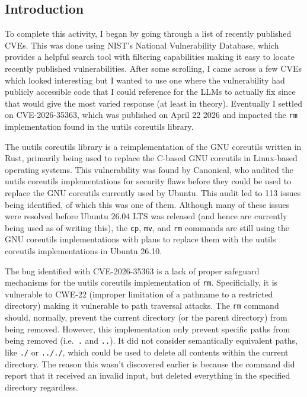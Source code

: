 \hypertarget{introduction}{%
\subsection{Introduction}\label{introduction}}

To complete this activity, I began by going through a list of recently
published CVEs. This was done using NIST's National Vulnerability
Database, which provides a helpful search tool with filtering
capabilities making it easy to locate recently published
vulnerabilities. After some scrolling, I came across a few CVEs which
looked interesting but I wanted to use one where the vulnerability had
publicly accessible code that I could reference for the LLMs to actually
fix since that would give the most varied response (at least in theory).
Eventually I settled on CVE-2026-35363, which was published on April 22
2026 and impacted the \texttt{rm} implementation found in the uutils
coreutils library.

The uutils coreutils library is a reimplementation of the GNU coreutils
written in Rust, primarily being used to replace the C-based GNU
coreutils in Linux-based operating systems. This vulnerability was found
by Canonical, who audited the uutils coreutils implementations for
security flaws before they could be used to replace the GNU coreutils
currently used by Ubuntu. This audit led to 113 issues being identified,
of which this was one of them. Although many of these issues were
resolved before Ubuntu 26.04 LTS was released (and hence are currently
being used as of writing this), the \texttt{cp}, \texttt{mv}, and
\texttt{rm} commands are still using the GNU coreutils implementations
with plans to replace them with the uutils coreutils implementations in
Ubuntu 26.10.

The bug identified with CVE-2026-35363 is a lack of proper safeguard
mechanisms for the uutils coreutils implementation of \texttt{rm}.
Specificially, it is vulnerable to CWE-22 (improper limitation of a
pathname to a restricted directory) making it vulnerable to path
traversal attacks. The \texttt{rm} command should, normally, prevent the
current directory (or the parent directory) from being removed. However,
this implementation only prevent specific paths from being removed
(i.e.~\texttt{.} and \texttt{..}). It did not consider semantically
equivalent paths, like \texttt{./} or \texttt{.././}, which could be
used to delete all contents within the current directory. The reason
this wasn't discovered earlier is because the command did report that it
received an invalid input, but deleted everything in the specified
directory regardless.

